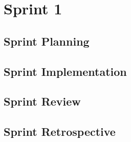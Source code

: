 \section{Sprint 1}

\subsection{Sprint Planning}

\subsection{Sprint Implementation}

\subsection{Sprint Review}

\subsection{Sprint Retrospective}

